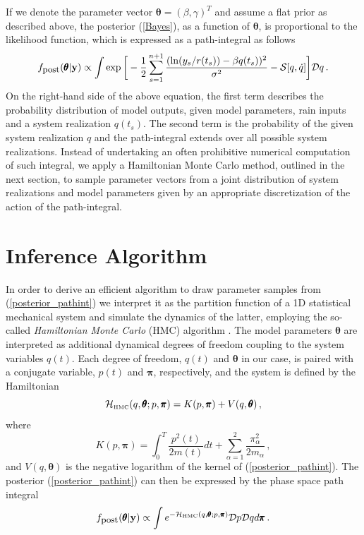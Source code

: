 \documentclass[12pt,a4paper,final]{iopart}
\newcommand{\bt}{\pmb\theta}
\newcommand{\vc}[1]{{\bf #1 }}
\begin{document}
If we denote the parameter vector $\bt=(\beta,\gamma)^T$ and assume a flat prior as described above, the posterior (\ref{Bayes}), as a function of $\bt$, is proportional to the likelihood function, which is expressed as a path-integral as follows
\begin{equation}\label{posterior_pathint}
  f_{\mbox{\small post}}(\bt | \vc y)
  \propto
  \int
  \exp\bigg[
    -\frac{1}{2}
    \sum_{s=1}^{n+1}
    \frac
    {(\ln(y_s/r(t_s))-{\beta q(t_s)})^2}
    {\sigma^2} -{{\mathcal S}}[{q},\dot q]
  \bigg]
  {\mathcal Dq}
  \,.
\end{equation}
On the right-hand side of the above equation, the first term describes the probability distribution of model outputs, given model parameters, rain inputs and a system realization $q(t_s)$. The second term is the probability of the given system realization $q$ and the path-integral extends over all possible system realizations. Instead of undertaking an often prohibitive numerical computation of such integral, we apply a Hamiltonian Monte Carlo method, outlined in the next section, to sample parameter vectors from a joint distribution of system realizations and model parameters given by an appropriate discretization of the action of the path-integral.



\section{Inference Algorithm}

In order to derive an efficient algorithm to draw parameter samples from (\ref{posterior_pathint}) we interpret it as the partition function of a 1D statistical mechanical system and simulate the dynamics of the latter, employing the so-called {\em Hamiltonian Monte Carlo} (HMC) algorithm \cite{duane_1987}.
The model parameters $\bt$ are interpreted as additional dynamical degrees of freedom coupling to the system variables $q(t)$.
Each degree of freedom, $q(t)$ and $\bt$ in our case, is paired with a conjugate variable, $p(t)$ and ${\pmb\pi}$, respectively, and the system is defined by the  Hamiltonian
\begin{equation}\label{Hamiltonian}
    \mathcal{H}_{\mbox{\tiny HMC}}(q,\bt; p,{\pmb\pi})
    =
    K( p,{\pmb\pi}) + V( q,\bt)\,,
\end{equation}
where
\begin{equation}\label{K}
   K( p,{\pmb\pi})
   =
   \int_0^T \frac{ p^2(t)}{2m(t)}dt
   + \sum_{\alpha=1}^2\frac{\pi_\alpha^2}{2m_\alpha}\,,
\end{equation}
and $V( q,\bt)$ is the negative logarithm of the kernel of (\ref{posterior_pathint}).
The posterior (\ref{posterior_pathint}) can then be expressed by the phase space path integral
\begin{equation}\label{phaseSpacePathInt}
    f_{\mbox{\small post}}(\bt | \vc y)
  \propto
  \int
  e^{-\mathcal {H}_{\mbox{\tiny HMC}}(q,\bt; p,{\pmb\pi})}
  {\mathcal Dp}
   {\mathcal Dq}
   d{\pmb\pi}
  \,.
\end{equation}
\end{document}
